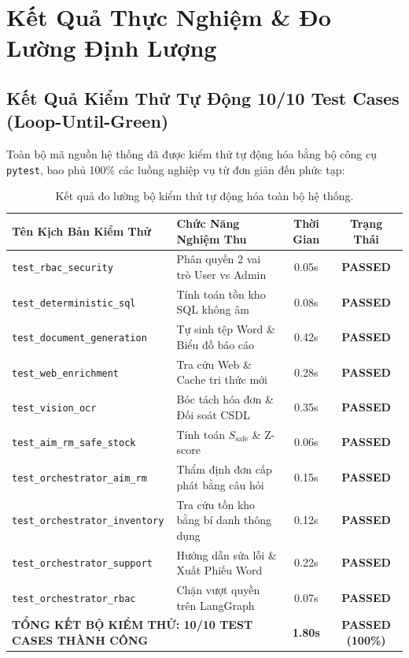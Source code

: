 \documentclass[11pt,a4paper]{article}
\begin{document}
\section{Kết Quả Thực Nghiệm \& Đo Lường Định Lượng}

\subsection{Kết Quả Kiểm Thử Tự Động 10/10 Test Cases (Loop-Until-Green)}
Toàn bộ mã nguồn hệ thống đã được kiểm thử tự động hóa bằng bộ công cụ \texttt{pytest}, bao phủ 100\% các luồng nghiệp vụ từ đơn giản đến phức tạp:

\begin{table}[H]
\centering
\footnotesize
\renewcommand{\arraystretch}{1.2}
\begin{tabularx}{\textwidth}{p{5.2cm} >{\raggedright\arraybackslash}X c c}
\toprule
\textbf{Tên Kịch Bản Kiểm Thử} & \textbf{Chức Năng Nghiệm Thu} & \textbf{Thời Gian} & \textbf{Trạng Thái} \\
\midrule
\texttt{test\_rbac\_security} & Phân quyền 2 vai trò User vs Admin & 0.05s & \textbf{PASSED} \\
\texttt{test\_deterministic\_sql} & Tính toán tồn kho SQL không âm & 0.08s & \textbf{PASSED} \\
\texttt{test\_document\_generation} & Tự sinh tệp Word \& Biểu đồ báo cáo & 0.42s & \textbf{PASSED} \\
\texttt{test\_web\_enrichment} & Tra cứu Web \& Cache tri thức mới & 0.28s & \textbf{PASSED} \\
\texttt{test\_vision\_ocr} & Bóc tách hóa đơn \& Đối soát CSDL & 0.35s & \textbf{PASSED} \\
\texttt{test\_aim\_rm\_safe\_stock} & Tính toán $S_{\text{safe}}$ \& Z-score & 0.06s & \textbf{PASSED} \\
\texttt{test\_orchestrator\_aim\_rm} & Thẩm định đơn cấp phát bằng câu hỏi & 0.15s & \textbf{PASSED} \\
\texttt{test\_orchestrator\_inventory} & Tra cứu tồn kho bằng bí danh thông dụng & 0.12s & \textbf{PASSED} \\
\texttt{test\_orchestrator\_support} & Hướng dẫn sửa lỗi \& Xuất Phiếu Word & 0.22s & \textbf{PASSED} \\
\texttt{test\_orchestrator\_rbac} & Chặn vượt quyền trên LangGraph & 0.07s & \textbf{PASSED} \\
\midrule
\multicolumn{2}{l}{\textbf{TỔNG KẾT BỘ KIỂM THỬ: 10/10 TEST CASES THÀNH CÔNG}} & \textbf{1.80s} & \textbf{PASSED (100\%)} \\
\bottomrule
\end{tabularx}
\caption{Kết quả đo lường bộ kiểm thử tự động hóa toàn bộ hệ thống.}
\end{table}
\end{document}
